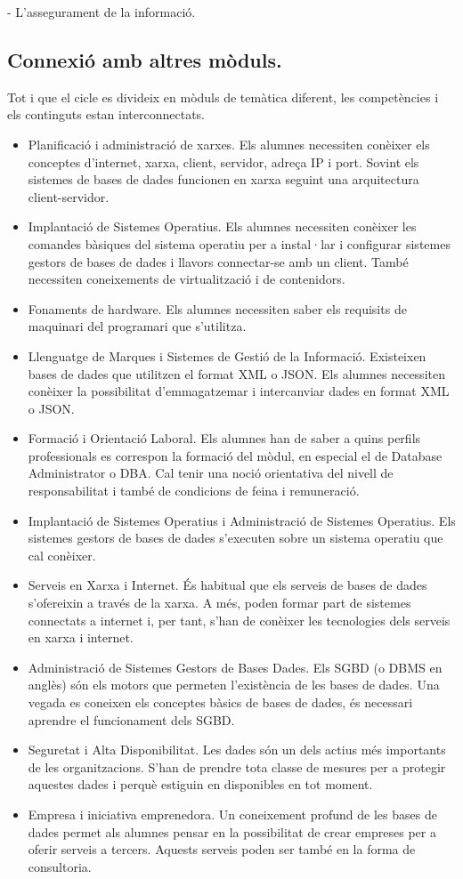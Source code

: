 \documentclass[catalan, a4paper, 12pt, titlepage]{article}
\begin{document}
- L'assegurament de la informació.

\subsection{Connexió amb altres mòduls.}

Tot i que el cicle es divideix en mòduls de temàtica diferent, les competències i els continguts estan interconnectats.

\begin{itemize}
	\item Planificació i administració de xarxes. Els alumnes necessiten conèixer els conceptes d'internet, xarxa, client, servidor, adreça IP i port. Sovint els sistemes de bases de dades funcionen en xarxa seguint una arquitectura client-servidor.
	\item Implantació de Sistemes Operatius. Els alumnes necessiten conèixer les comandes bàsiques del sistema operatiu per a instal·lar i configurar sistemes gestors de bases de dades i llavors connectar-se amb un client. També necessiten coneixements de virtualització i de contenidors.
	\item Fonaments de hardware. Els alumnes necessiten saber els requisits de maquinari del programari que s'utilitza.
	\item Llenguatge de Marques i Sistemes de Gestió de la Informació. Existeixen bases de dades que utilitzen el format XML o JSON. Els alumnes necessiten conèixer la possibilitat d'emmagatzemar i intercanviar dades en format XML o JSON.
	\item Formació i Orientació Laboral. Els alumnes han de saber a quins perfils professionals es correspon la formació del mòdul, en especial el de Database Administrator o DBA. Cal tenir una noció orientativa del nivell de responsabilitat i també de condicions de feina i remuneració.
	\item Implantació de Sistemes Operatius i Administració de Sistemes Operatius. Els sistemes gestors de bases de dades s'executen sobre un sistema operatiu que cal conèixer.
	\item Serveis en Xarxa i Internet. És habitual que els serveis de bases de dades s'ofereixin a través de la xarxa. A més, poden formar part de sistemes connectats a internet i, per tant, s'han de conèixer les tecnologies dels serveis en xarxa i internet.
	\item Administració de Sistemes Gestors de Bases Dades. Els SGBD (o DBMS en anglès) són els motors que permeten l'existència de les bases de dades. Una vegada es coneixen els conceptes bàsics de bases de dades, és necessari aprendre el funcionament dels SGBD.
	\item Seguretat i Alta Disponibilitat. Les dades són un dels actius més importants de les organitzacions. S'han de prendre tota classe de mesures per a protegir aquestes dades i perquè estiguin en disponibles en tot moment.
	\item Empresa i iniciativa emprenedora. Un coneixement profund de les bases de dades permet als alumnes pensar en la possibilitat de crear empreses per a oferir serveis a tercers. Aquests serveis poden ser també en la forma de consultoria.
\end{itemize}
\end{document}
